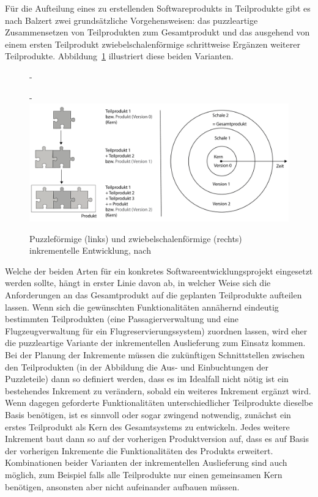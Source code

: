 Für die Aufteilung eines zu erstellenden Softwareprodukts in Teilprodukte gibt es nach Balzert \cite[526 \psq]{bal08} zwei grundsätzliche Vorgehensweisen: das puzzle\-artige Zusammensetzen von Teilprodukten zum Gesamtprodukt und das ausgehend von einem ersten Teilprodukt zwiebelschalenförmige schrittweise Ergänzen weiterer Teilprodukte. Abbildung~\ref{fig:inkrementelle_entwicklung} illustriert diese beiden Varianten. 

\begin{figure}[h!]
	\vspace{\baselineskip} %
	\begin{addmargin*}[0cm]{-\marginparwidth}
	\begin{addmargin*}[0cm]{-\marginparsep}
		\centering
		\includegraphics[width=1.2\textwidth]{Bilder/Kapitel-2/PuzzleZwiebel.pdf}
		\caption[Puzzleförmige und zwiebelschalenförmige inkrementelle Entwicklung]{Puzzleförmige (links) und zwiebelschalenförmige (rechts) inkrementelle Entwicklung, nach \cite[527]{bal08}}
		\label{fig:inkrementelle_entwicklung}
	\end{addmargin*}
	\end{addmargin*}
\end{figure}

Welche der beiden Arten 
für ein konkretes Softwareentwicklungsprojekt eingesetzt werden sollte, hängt in erster Linie davon ab, in welcher Weise sich die Anforderungen an das Gesamtprodukt auf die geplanten Teilprodukte aufteilen lassen. Wenn sich die gewünschten Funktionalitäten annähernd eindeutig bestimmten Teilprodukten (\zb eine Passagierverwaltung und eine Flugzeugverwaltung für ein Flugreservierungssystem) zuordnen lassen, wird eher die puzzleartige Variante der inkrementellen Auslieferung zum Einsatz kommen. Bei der Planung der Inkremente müssen die zukünftigen Schnittstellen zwischen den Teilprodukten (in der Abbildung die Aus- und Einbuchtungen der Puzzleteile) dann so definiert werden, dass es im Ideal\-fall nicht nötig ist ein bestehendes Inkrement zu verändern, sobald ein weiteres Inkrement ergänzt wird.  Wenn dagegen geforderte Funktionalitäten unterschiedlicher Teilprodukte dieselbe Basis benötigen, ist es sinnvoll oder sogar zwingend notwendig, zunächst ein erstes Teilprodukt als Kern des Gesamtsystems zu entwickeln. Jedes weitere Inkrement baut dann so auf der vorherigen Pro\-dukt\-ver\-sion auf, dass es auf Basis der vorherigen Inkremente die Funktionalitäten des Produkts erweitert. Kombinationen beider Varianten der inkrementellen Auslieferung sind auch möglich, zum Beispiel falls alle Teilprodukte nur einen gemeinsamen Kern benötigen, ansonsten aber nicht aufeinander aufbauen müssen.


